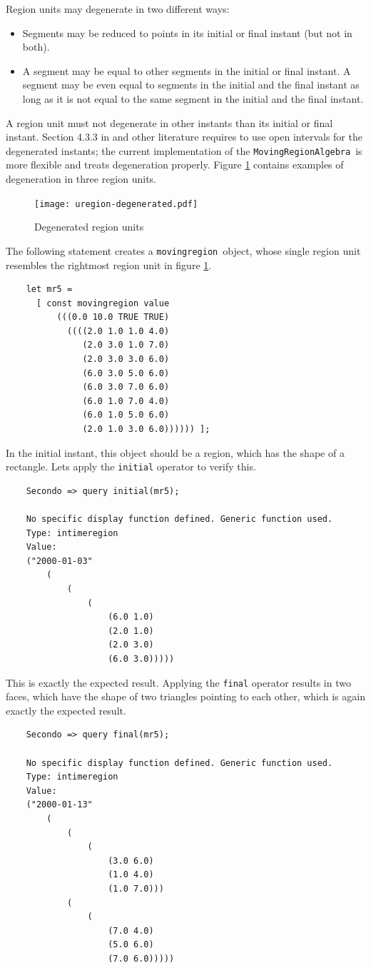\documentclass[a4paper,12pt]{article}
\newcommand{\mra}{{\tt MovingRegionAlgebra}}
\newcommand{\mr}{{\tt movingregion}}
\begin{document}
Region units may degenerate in two different ways:
\begin{itemize}
  \item Segments may be reduced
    to points in its initial or final instant (but not in both).
  \item A segment may be equal to other segments in
    the initial or final instant. A segment may be even equal to 
    segments in the initial and the final instant as long as it is not
    equal to the same segment in the initial and the final instant.
\end{itemize}
A region unit must not degenerate in other instants than its initial
or final instant. Section 4.3.3 in \cite{GuS04} and other literature
requires to use open
intervals for the degenerated instants; the current implementation of
the \mra\ is more flexible and treats degeneration properly.
Figure \ref{creating:simple2} contains examples of
degeneration in three region units.
\begin{figure}
  \begin{center}
    \texttt{[image: uregion-degenerated.pdf]}
  \end{center}
  \caption{Degenerated region units}
  \label{creating:simple2}
\end{figure}

The following statement creates a \mr\ object, whose single region
unit resembles the rightmost region unit in figure \ref{creating:simple2}.
\begin{verbatim}
    let mr5 =
      [ const movingregion value
          (((0.0 10.0 TRUE TRUE)
            ((((2.0 1.0 1.0 4.0)
               (2.0 3.0 1.0 7.0)
               (2.0 3.0 3.0 6.0)
               (6.0 3.0 5.0 6.0)
               (6.0 3.0 7.0 6.0)
               (6.0 1.0 7.0 4.0)
               (6.0 1.0 5.0 6.0)
               (2.0 1.0 3.0 6.0)))))) ];
\end{verbatim}
In the initial instant, this object should be a region, which has the
shape of a rectangle. Lets apply the {\tt initial} operator to verify this.
\begin{verbatim}
    Secondo => query initial(mr5);

    No specific display function defined. Generic function used.
    Type: intimeregion
    Value: 
    ("2000-01-03" 
        (
            (
                (
                    (6.0 1.0) 
                    (2.0 1.0) 
                    (2.0 3.0) 
                    (6.0 3.0)))))
\end{verbatim}
This is exactly the expected result. Applying the {\tt final} operator
results in two faces, which have the shape of two triangles pointing to
each other, which is again exactly the expected result.
\begin{verbatim}
    Secondo => query final(mr5);

    No specific display function defined. Generic function used.
    Type: intimeregion
    Value:
    ("2000-01-13" 
        (
            (
                (
                    (3.0 6.0) 
                    (1.0 4.0) 
                    (1.0 7.0))) 
            (
                (
                    (7.0 4.0) 
                    (5.0 6.0) 
                    (7.0 6.0)))))
\end{verbatim}
\end{document}
